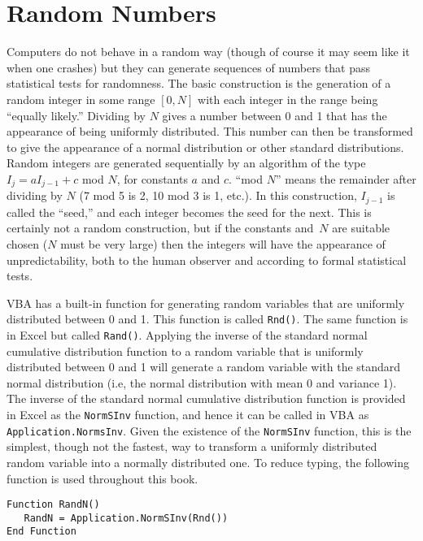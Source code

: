 \section{Random Numbers}

Computers do not behave in a random way (though of course it may seem like it when one crashes) but  they can generate sequences of numbers that pass statistical tests for randomness.  The basic construction is the generation of a random integer in some range $[0,N]$ with each integer in the range being ``equally likely.''  Dividing by $N$ gives a number between 0 and 1 that has the appearance of being uniformly distributed.  This number can then be transformed to give the appearance of a normal distribution or other standard distributions.  Random integers are generated sequentially by an algorithm of the type $I_j = aI_{j-1}+c$ mod $N$, for constants $a$ and $c$.  ``mod $N$'' means the remainder after dividing by $N$ (7 mod 5 is 2, 10 mod 3 is 1, etc.).  In this construction, $I_{j-1}$ is called the ``seed,'' and each integer becomes the seed for the next.  This is certainly not a random construction, but if the constants and~$N$ are suitable chosen ($N$ must be very large) then the integers will have the appearance of unpredictability, both to the human observer and according to formal statistical tests.  

VBA has a built-in function for generating random variables that are uniformly distributed between 0 and 1.  This function is called \verb!Rnd()!.  The same function is in Excel but  called \verb!Rand()!. Applying the inverse of the standard normal cumulative distribution function to a random variable that is uniformly distributed between 0 and 1 will generate a random variable with the standard normal distribution (i.e, the normal distribution with  mean 0 and variance 1).  The inverse of the standard normal cumulative distribution function is provided in Excel as the \verb!NormSInv! function, and hence it can be called in VBA as \verb!Application.NormsInv!.  Given the existence of the \verb!NormSInv! function, this is the simplest, though not the fastest, way to transform a uniformly distributed random variable into a normally distributed one.  To reduce typing, the following function is used throughout this book.

\small\begin{verbatim}
Function RandN()
   RandN = Application.NormSInv(Rnd())
End Function
\end{verbatim}\normalsize

